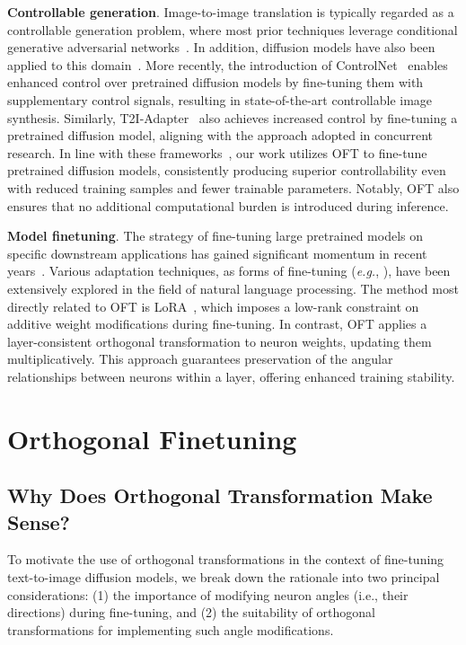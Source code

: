 \textbf{Controllable generation}. Image-to-image translation is typically regarded as a controllable generation problem, where most prior techniques leverage conditional generative adversarial networks~\cite{isola2017image,zhu2017toward,wang2018high,park2019semantic,choi2018stargan}. In addition, diffusion models have also been applied to this domain~\cite{saharia2022palette,voynov2022sketch,wang2022pretraining}. More recently, the introduction of ControlNet~\cite{zhang2023adding} enables enhanced control over pretrained diffusion models by fine-tuning them with supplementary control signals, resulting in state-of-the-art controllable image synthesis. Similarly, T2I-Adapter~\cite{mou2023t2i} also achieves increased control by fine-tuning a pretrained diffusion model, aligning with the approach adopted in concurrent research. In line with these frameworks~\cite{zhang2023adding,mou2023t2i}, our work utilizes OFT to fine-tune pretrained diffusion models, consistently producing superior controllability even with reduced training samples and fewer trainable parameters. Notably, OFT also ensures that no additional computational burden is introduced during inference.

\textbf{Model finetuning}. The strategy of fine-tuning large pretrained models on specific downstream applications has gained significant momentum in recent years~\cite{devlin2018bert,brown2020language,he2022masked}. Various adaptation techniques, as forms of fine-tuning (\emph{e.g.}, \cite{hulora2022,houlsby2019parameter,pfeiffer2020adapterfusion}), have been extensively explored in the field of natural language processing. The method most directly related to OFT is LoRA~\cite{hulora2022}, which imposes a low-rank constraint on additive weight modifications during fine-tuning. In contrast, OFT applies a layer-consistent orthogonal transformation to neuron weights, updating them multiplicatively. This approach guarantees preservation of the angular relationships between neurons within a layer, offering enhanced training stability.

\section{Orthogonal Finetuning}

\subsection{Why Does Orthogonal Transformation Make Sense?}

To motivate the use of orthogonal transformations in the context of fine-tuning text-to-image diffusion models, we break down the rationale into two principal considerations: (1) the importance of modifying neuron angles (i.e., their directions) during fine-tuning, and (2) the suitability of orthogonal transformations for implementing such angle modifications.

